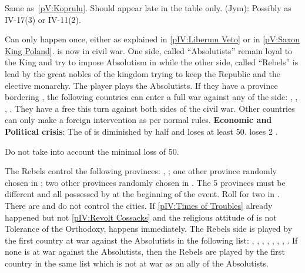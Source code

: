 
Same as~\ref{pV:Koprulu}. Should appear late in the table only. (Jym):
Possibly as IV-17(3) or IV-11(2).

\vfill \pagebreak



\vfill \pagebreak





\phevnt
\aparag Can only happen once, either as explained in \ref{pIV:Liberum Veto} or
in \ref{pV:Saxon King Poland}.
\aparag \POL is now in civil war. One side, called ``Absolutists'' remain
loyal to the King and try to impose Absolutism in \POL while the other side,
called ``Rebels'' is lead by the great nobles of the kingdom trying to keep
the Republic and the elective monarchy.
\bparag The player plays the Absolutists.
\aparag If they have a province bordering \POL, the following countries can
enter a full war against any of the side: \RUS, \SUE, \HAB, \PRU.
\bparag They have a free \CB this turn against both sides of the civil war.
\bparag Other countries can only make a foreign intervention as per normal
rules.
\aparag \textbf{Economic and Political crisis}: The \RT of \POL is diminished
by half and loses at least 50\ducats. \POL loses 2 \STAB.
\begin{oldcompta}
  \bparag Do not take into account the minimal loss of 50\ducats.
\end{oldcompta}
\aparag The Rebels control the following provinces:
\bparag \provinceMalopolska, \provinceLietuva ;
\bparag one other province randomly chosen in \paysmajeurPologne;
\bparag two other provinces randomly chosen in \paysmajeurLithuanie.
\bparag The 5 provinces must be different and all possessed by \POL at the
beginning of the event.
\aparag Roll for two \REVOLT in \POL. There are \facemoins and do not control
the cities.
\aparag If \ref{pIV:Times of Troubles} already happened but not
\ref{pIV:Revolt Cossacks} and the religious attitude of \POL is not Tolerance
of the Orthodoxy,  happens immediately.
\aparag The Rebels side is played by the first country at war against the
Absolutists in the following list: \RUS, \SUE, \HAB, \TUR, \HOL, \ANG, \FRA,
\PRU.
\bparag If none is at war against the Absolutists, then the Rebels are played
by the first country in the same list which is not at war as an ally of the
Absolutists.

